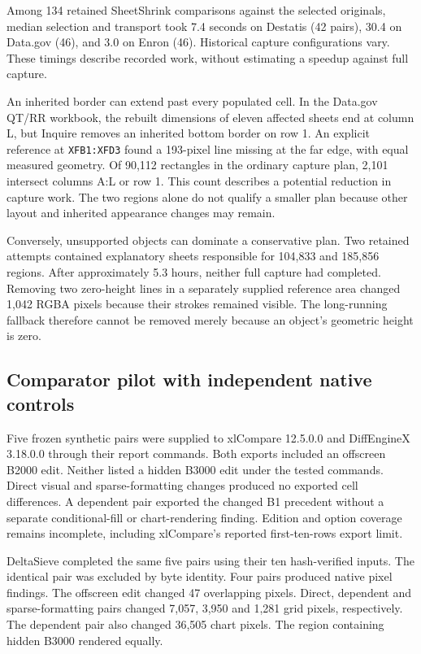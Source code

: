 Among 134 retained SheetShrink comparisons against the selected originals,
median selection and transport took 7.4 seconds on Destatis (42 pairs),
30.4 on Data.gov (46), and 3.0 on Enron (46). Historical capture
configurations vary. These timings describe recorded work, without
estimating a speedup against full capture.

An inherited border can extend past every populated cell. In the Data.gov
QT/RR workbook, the rebuilt dimensions of eleven affected sheets end
at column L, but Inquire removes an inherited bottom border on row 1.
An explicit reference at \texttt{XFB1:XFD3} found a 193-pixel line missing
at the far edge, with equal measured geometry. Of 90,112 rectangles in
the ordinary capture plan, 2,101 intersect columns A:L or row 1.
This count
describes a potential reduction in capture work. The two
regions alone do not qualify a smaller plan because other layout
and inherited appearance changes may remain.

Conversely, unsupported objects can dominate a conservative plan. Two retained
attempts contained explanatory sheets responsible for 104,833 and 185,856 regions.
After approximately 5.3 hours, neither full capture had completed. Removing two
zero-height lines in a separately supplied reference area changed 1,042 RGBA
pixels because their strokes remained visible. The long-running fallback
therefore cannot be removed merely because an object's geometric height is zero.

\subsection{Comparator pilot with independent native controls}
Five frozen synthetic pairs were supplied to xlCompare 12.5.0.0 and DiffEngineX
3.18.0.0 through their report commands. Both exports included an offscreen B2000
edit. Neither listed a hidden B3000 edit under the tested commands. Direct visual
and sparse-formatting changes produced no exported cell differences. A dependent
pair exported the changed B1 precedent without a separate conditional-fill or
chart-rendering finding. Edition and option coverage remains incomplete, including
xlCompare's reported first-ten-rows export limit.

DeltaSieve completed the same five pairs using their ten hash-verified inputs.
The identical pair was excluded by byte identity. Four pairs produced native
pixel findings. The offscreen edit changed 47 overlapping pixels. Direct,
dependent and sparse-formatting pairs changed 7,057, 3,950 and 1,281 grid pixels,
respectively. The dependent pair also changed 36,505 chart pixels. The region
containing hidden B3000 rendered equally.

